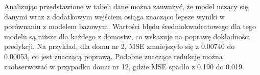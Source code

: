 \documentclass[a4paper,twoside,12pt]{book}
\begin{document}
\begin{table}[!h]
  \centering
  \caption{Porównanie wartości MSE dla dwóch modeli w kontekście poszczególnych domostw}
  \renewcommand{\arraystretch}{1.5}
\end{table}

Analizując przedstawione w tabeli dane można zauważyć, że model uczący się danymi wraz z dodatkowym wejściem osiąga znacząco lepsze wyniki w porównaniu z modelem bazowym. Wartości błędu średniokwadratowego dla tego modelu są niższe dla każdego z domostw, co wskazuje na poprawę dokładności predykcji.
Na przykład, dla domu nr 2, MSE zmniejszyło się z 0.00740 do 0.00053, co jest znaczącą poprawą. Podobne znaczące redukcje można zaobserwować w przypadku domu nr 12, gdzie MSE spadło z 0.190 do 0.019.
\end{document}

